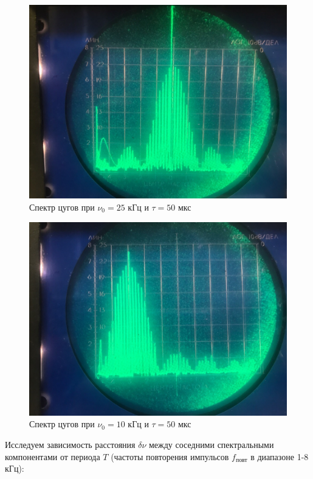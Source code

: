 \documentclass[a4paper, fontsize=14pt]{article}
\begin{document}
\begin{figure}[H]
\center
\includegraphics[scale=0.3]{6.jpg}
\caption{Спектр цугов при $\nu_0 = 25$ кГц и $\tau = 50$ мкс}
\end{figure}
\begin{figure}[H]
\center
\includegraphics[scale=0.3]{7.jpg}
\caption{Спектр цугов при $\nu_0 = 10$ кГц и $\tau = 50$ мкс}
\end{figure}
Исследуем зависимость расстояния $\delta \nu$ между соседними спектральными компонентами от периода $T$ (частоты повторения импульсов $f_\text{повт}$ в диапазоне 1-8 кГц):
\end{document}
